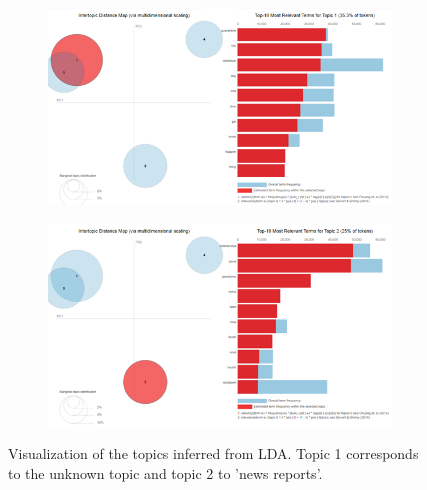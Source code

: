 \begin{figure}
 \centering
 \begin{subfigure}{0.75\columnwidth}
 \includegraphics[width=1\textwidth]{images/lda1.png}
 \end{subfigure}
 \centering
 \begin{subfigure}{0.75\columnwidth}
 \includegraphics[width=1\textwidth]{images/lda2.png}
 \end{subfigure}
 \caption{Visualization of the topics inferred from LDA. Topic 1 corresponds to the unknown topic and topic 2 to 'news reports'.}
 \label{fig:lda_viz_1}
\end{figure}



